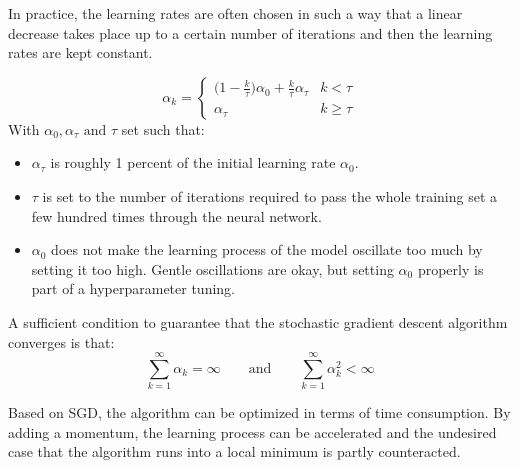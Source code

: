 \begin{remark}\label{rem:fall_lernRate}
	In practice, the learning rates are often chosen in such a way that a linear decrease takes place up to a certain number of iterations and then the learning rates are kept constant.
	
	\begin{equation*}
		\alpha_k = 
		\begin{cases}
			\big(1 - \frac{k}{\tau} \big) \alpha_0 + \frac{k}{\tau} \alpha_\tau 	& \text{$k < \tau$}\\
			\alpha_\tau 															& \text{$k \geq \tau$}
		\end{cases}
	\end{equation*}
	With $\alpha_0, \alpha_\tau \text{ and } \tau$ set such that:
	\begin{itemize}
		\item $\alpha_\tau$ is roughly 1 percent of the initial learning rate $\alpha_0$.
		\item $\tau$ is set to the number of iterations required to pass the whole training set a few hundred times through the neural network.
		\item $\alpha_0$ does not make the learning process of the model oscillate too much by setting it too high. Gentle oscillations are okay, but setting $\alpha_0$ properly is part of a hyperparameter tuning.
	\end{itemize}
	
\end{remark}

\begin{remark}	
A sufficient condition to guarantee that the stochastic gradient descent algorithm converges is that:
	\begin{equation*}
	\sum_{k=1}^\infty \alpha_k = \infty \quad \quad \text{and} \quad \quad \sum_{k=1}^\infty \alpha_k^2 < \infty
	\end{equation*}
\end{remark}

Based on SGD, the algorithm can be optimized in terms of time consumption. By adding a momentum, the learning process can be accelerated and the undesired case that the algorithm runs into a local minimum is partly counteracted.


